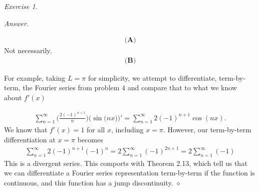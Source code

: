 \documentclass[12pt,oneside]{amsart}
\theoremstyle{definition}
\theoremstyle{remark}
\newtheorem{exer}{Exercise}
\numberwithin{equation}{exer}
\newenvironment{answer}{\bigskip\noindent\emph{Answer.}}{\hfill$\diamond$\newline}
\begin{document}
\newpage


\begin{exer} 

\end{exer}
\begin{answer}


\begin{align*}
    \textbf{(A)}
\end{align*}
 Not necessarily. 
\begin{align*}
    \textbf{(B)}
\end{align*}

For example, taking $L=\pi$ for simplicity, we attempt to differentiate, term-by-term, the Fourier series from problem 4 and compare that to what we know about $f'(x)$  

\begin{align*}
    \sum_{n=1}^{\infty} \Big(\frac{2(-1)^{n+1}}{n }\Big)\Big(\sin\big( n x\big)\Big)' = \sum_{n=1}^{\infty}2(-1)^{n+1}\cos(nx).
\end{align*}
We know that $f'(x) = 1 $ for all $x$, including $x=\pi$. However, our term-by-term differentiation at $x=\pi$ becomes
\begin{align*}
    \sum_{n=1}^{\infty}2(-1)^{n+1}(-1)^n = 2\sum_{n=1}^{\infty}(-1)^{2n+1}= 2\sum_{n=1}^{\infty}(-1)
\end{align*}
This is a divergent series. This comports with Theorem 2.13, which tell us that we can differentiate a Fourier series representation term-by-term if the function is continuous, and this function has a jump discontinuity. 
\end{answer}
\end{document}
